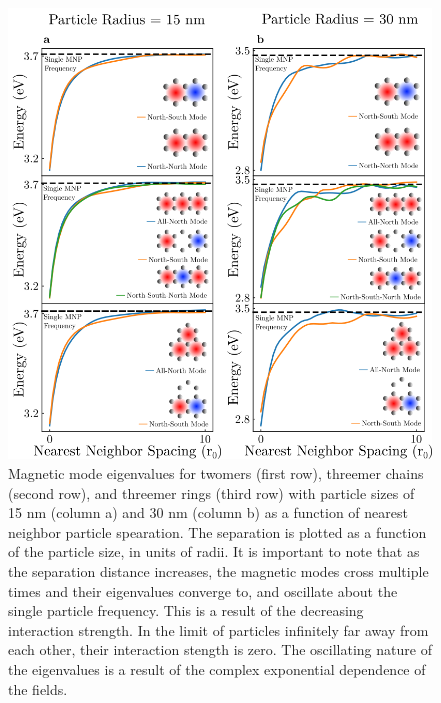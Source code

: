 \documentclass[journal=ancac3,manuscript=article]{achemso}
\begin{document}
\begin{figure}
\centering
\includegraphics[width=.65\paperwidth]{spacing_study.png}
\caption{Magnetic mode eigenvalues for twomers (first row), threemer chains (second row), and threemer rings (third row) with particle sizes of 15 nm (column a) and 30 nm (column b) as a function of nearest neighbor particle spearation. The separation is plotted as a function of the particle size, in units of radii. It is important to note that as the separation distance increases, the magnetic modes cross multiple times and their eigenvalues converge to, and oscillate about the single particle frequency. This is a result of the decreasing interaction strength. In the limit of particles infinitely far away from each other, their interaction stength is zero. The oscillating nature of the eigenvalues is a result of the complex exponential dependence of the fields.}
\label{fig:spacing}
\end{figure}
\end{document}
